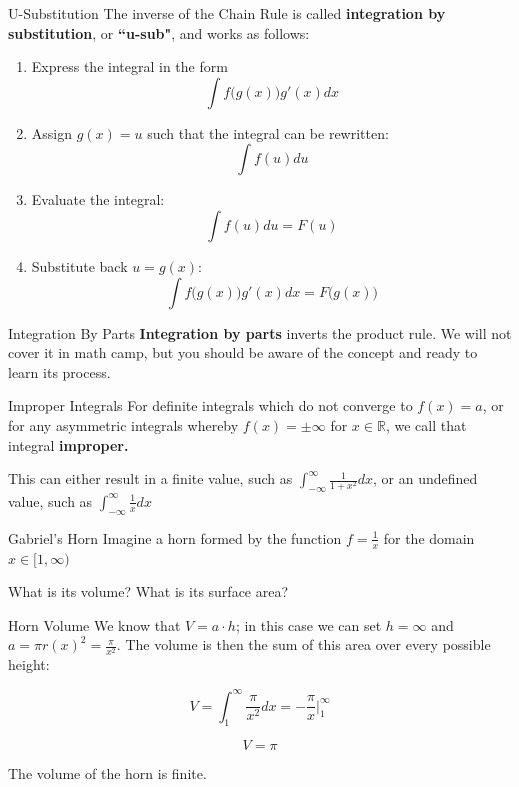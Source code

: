 \documentclass[10pt]{beamer}
\begin{document}
\begin{frame}{U-Substitution}
    The inverse of the Chain Rule is called \textbf{integration by substitution}, or \textbf{``u-sub"}, and works as follows:

    \begin{enumerate}
        \item Express the integral in the form
        \[\int f\Big(g(x)\Big) g'(x) dx\]
        \item Assign $g(x) = u$ such that the integral can be rewritten:
        \[ \int f(u) du\]
        \item Evaluate the integral:
        \[\int f(u) du = F(u)\]
        \item Substitute back $u = g(x)$:
        \[\int f\Big(g(x)\Big) g'(x) dx = F\Big(g(x)\Big)\]
    \end{enumerate}
\end{frame}

\begin{frame}{Integration By Parts}
    \textbf{Integration by parts} inverts the product rule. We will not cover it in math camp, but you should be aware of the concept and ready to learn its process.
\end{frame}

\begin{frame}{Improper Integrals}
    For definite integrals which do not converge to $f(x) = a$, or for any asymmetric integrals whereby $f(x) = \pm \infty$ for $x \in \mathbb{R}$, we call that integral \textbf{improper.} \\

    \vspace{.5cm}

    This can either result in a finite value, such as $\int_{-\infty}^{\infty} \frac{1}{1+x^2}dx$, or an undefined value, such as $\int_{-\infty}^{\infty} \frac{1}{x} dx$
\end{frame}

\begin{frame}{Gabriel's Horn}
    Imagine a horn formed by the function $f = \frac{1}{x}$ for the domain $x \in [1, \infty)$

    What is its volume? What is its surface area?
\end{frame}

\begin{frame}{Horn Volume}
    We know that $V = a \cdot h$; in this case we can set $h = \infty$ and $a = \pi r(x)^2 =\frac{\pi}{x^2}$. The volume is then the sum of this area over every possible height:

    \[V = \int_1^\infty \frac{\pi}{x^2} dx = - \frac{\pi}{x} \bigg|_1^{\infty} \]

    \[V = \pi\]

    The volume of the horn is finite.
\end{frame}
\end{document}
